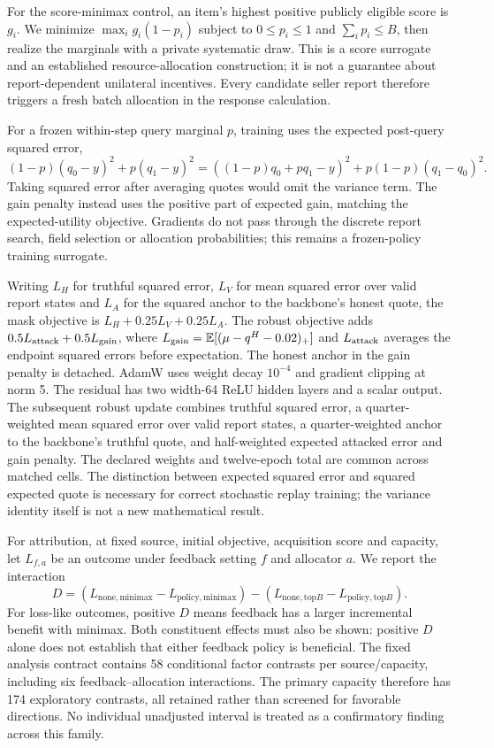 \documentclass[11pt]{article}
\begin{document}
For the score-minimax control, an item's highest positive publicly eligible
score is $g_i$. We minimize $\max_i g_i(1-p_i)$ subject to $0\le p_i\le1$ and
$\sum_i p_i\le B$, then realize the marginals with a private systematic draw.
This is a score surrogate and an established resource-allocation construction;
it is not a guarantee about report-dependent unilateral incentives. Every
candidate seller report therefore triggers a fresh batch allocation in the
response calculation.

For a frozen within-step query marginal $p$, training uses the expected
post-query squared error,
\[
 (1-p)(q_0-y)^2+p(q_1-y)^2
 =((1-p)q_0+pq_1-y)^2+p(1-p)(q_1-q_0)^2.
\]
Taking squared error after averaging quotes would omit the variance term.
The gain penalty instead uses the positive part of expected gain, matching
the expected-utility objective. Gradients do not pass through the discrete
report search, field selection or allocation probabilities; this remains a
frozen-policy training surrogate.

Writing $L_H$ for truthful squared error, $L_V$ for mean squared error over
valid report states and $L_A$ for the squared anchor to the backbone's honest
quote, the mask objective is $L_H+0.25L_V+0.25L_A$. The robust objective adds
$0.5L_{\rm attack}+0.5L_{\rm gain}$, where
$L_{\rm gain}=\mathbb{E}[(\mu-q^H-0.02)_+]$ and $L_{\rm attack}$ averages the
endpoint squared errors before expectation. The honest anchor in the gain
penalty is detached. AdamW uses weight decay $10^{-4}$ and gradient clipping
at norm 5. The residual has two width-64 ReLU hidden layers and a scalar output.
The subsequent robust update combines truthful squared error, a quarter-weighted
mean squared error over valid report states, a quarter-weighted anchor to the
backbone's truthful quote, and half-weighted expected attacked error and gain
penalty. The declared weights and twelve-epoch total are common across matched
cells. The distinction between expected squared error and squared expected
quote is necessary for correct stochastic replay training; the variance identity
itself is not a new mathematical result.

For attribution, at fixed source, initial objective, acquisition score and
capacity, let $L_{f,a}$ be an outcome under feedback setting $f$ and allocator
$a$. We report the interaction
\[
 D=(L_{\mathrm{none},\mathrm{minimax}}-L_{\mathrm{policy},\mathrm{minimax}})
  -(L_{\mathrm{none},\mathrm{top}B}-L_{\mathrm{policy},\mathrm{top}B}).
\]
For loss-like outcomes, positive $D$ means feedback has a larger incremental
benefit with minimax. Both constituent effects must also be shown: positive
$D$ alone does not establish that either feedback policy is beneficial. The
fixed analysis contract contains 58 conditional factor contrasts per
source/capacity, including six feedback--allocation interactions. The primary
capacity therefore has 174 exploratory contrasts, all retained rather than
screened for favorable directions. No individual unadjusted interval is treated
as a confirmatory finding across this family.
\end{document}
